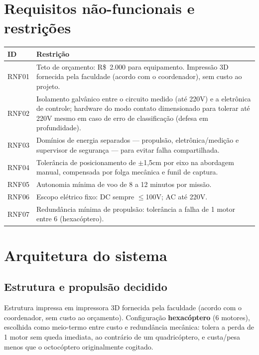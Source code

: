 \documentclass[11pt,a4paper]{article}
\newcommand{\statusok}{\textcolor{voltok}{\textbf{decidido}}}
\begin{document}
\section{Requisitos não-funcionais e restrições}

\begin{longtable}{@{}p{1.9cm}p{12.3cm}@{}}
\toprule
\textbf{ID} & \textbf{Restrição} \\
\midrule
\endhead
\bottomrule
\endfoot
RNF01 & Teto de orçamento: R\$~2.000 para equipamento. Impressão 3D fornecida pela faculdade (acordo com o coordenador), sem custo ao projeto. \\
RNF02 & Isolamento galvânico entre o circuito medido (até 220V) e a eletrônica de controle; hardware do modo contato dimensionado para tolerar até 220V mesmo em caso de erro de classificação (defesa em profundidade). \\
RNF03 & Domínios de energia separados — propulsão, eletrônica/medição e supervisor de segurança — para evitar falha compartilhada. \\
RNF04 & Tolerância de posicionamento de $\pm$1,5cm por eixo na abordagem manual, compensada por folga mecânica e funil de captura. \\
RNF05 & Autonomia mínima de voo de 8 a 12 minutos por missão. \\
RNF06 & Escopo elétrico fixo: DC sempre $\leq$100V; AC até 220V. \\
RNF07 & Redundância mínima de propulsão: tolerância a falha de 1 motor entre 6 (hexacóptero). \\
\end{longtable}

\section{Arquitetura do sistema}

\subsection{Estrutura e propulsão \normalfont\statusok}

Estrutura impressa em impressora 3D fornecida pela faculdade (acordo com o coordenador, sem custo ao orçamento). Configuração \textbf{hexacóptero} (6 motores), escolhida como meio-termo entre custo e redundância mecânica: tolera a perda de 1 motor sem queda imediata, ao contrário de um quadricóptero, e custa/pesa menos que o octocóptero originalmente cogitado.
\end{document}
